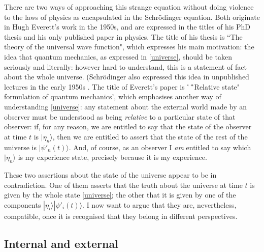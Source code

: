 \documentclass[12pt,reqno]{article}
\renewcommand{\(}{\left(}
\renewcommand{\)}{\right)}
\newcommand{\<}{\langle}
\renewcommand{\>}{\rangle}
\theoremstyle{plain} %
\begin{document}
There are two ways of approaching this strange equation without doing violence to the laws of physics as encapsulated in the Schr\"odinger equation. Both originate in Hugh Everett's work in the 1950s, and are expressed in the titles of his PhD thesis and his only published paper in physics. The title of his thesis is ``The theory of the universal wave function", which expresses his main motivation: the idea that quantum mechanics, as expressed in \eqref{universe}, should be taken seriously and literally: however hard to understand, this is a statement of fact about the whole universe. (Schr\"odinger also expressed this idea in unpublished lectures in the early 1950s \cite{Schrodinger:interpretns}. The title of Everett's paper is $`\,``$Relative state" formulation of quantum mechanics', which emphasises another way of understanding \eqref{universe}: any statement about the external world made by an observer must be understood as being \emph{relative} to a particular state of that observer: if, for any reason, we are entitled to say that the state of the observer at time $t$ is $|\eta_n\>$, then we are entitled to assert that the state of the rest of the universe is $|\psi'_n(t)\>$. And, of course, as an observer I \emph{am} entitled to say which $|\eta_n\>$ is my experience state, precisely because it is my experience.

These two assertions about the state of the universe appear to be in contradiction. One of them asserts that the truth about the universe at time $t$ is given by the whole state \eqref{universe}; the other that it is given by one of the components $|\eta_i\>|\psi'_i(t)\>$. I now want to argue that they are, nevertheless, compatible, once it is recognised that they belong in different perspectives.
 


\subsection{Internal and external}
\label{susec:intext}
\end{document}
